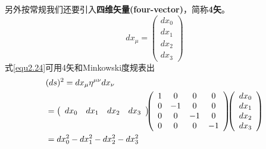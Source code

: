 另外按常规我们还要引入{\bf{四维矢量(four-vector)}}，简称{\bf{4矢}}。
\begin{equation}\label{equ2.25}
  dx_\mu =\left(\begin{array}{c}
            dx_0 \\
            dx_1 \\
            dx_2 \\
            dx_3
          \end{array}\right)
\end{equation}
式\eqref{equ2.24}可用4矢和Minkowski度规表出
\begin{align}
  &(ds)^2=dx_\mu \eta^{\mu\nu} dx_\nu \notag \\
  &=\left(
     \begin{array}{cccc}
       dx_0 & dx_1 & dx_2 & dx_3 \\
     \end{array}
   \right)
   \!\!\!
   \left(
     \begin{array}{cccc}
       1 & 0 & 0 & 0 \\
       0 & -1 & 0 & 0 \\
        0 & 0 & -1 & 0 \\
        0 & 0 & 0  & -1\\
     \end{array}
   \right)
   \!\!\!
   \left(
     \begin{array}{c}
       dx_0 \\
        dx_1 \\
       dx_2 \\
        dx_3\\
     \end{array}
   \right)\notag \\
   &=dx_0^2-dx_1^2-dx_2^2-dx_3^2 \label{equ2.26}
\end{align}

